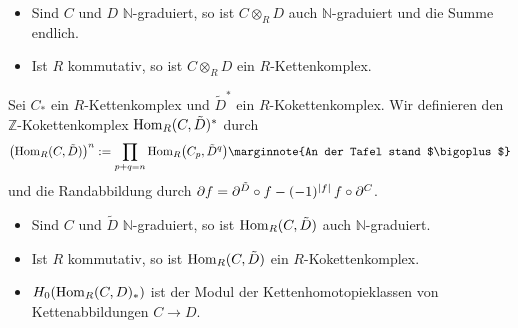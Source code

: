 \begin{bemerkung}[{name=[{zur Definition des Tensorprodukts von Kettenkomplexen}]}]
	\leavevmode
	\begin{itemize}[itemsep=0pt]
		\item Sind $C$ und $D$ $\mathbb{N}$-graduiert, so ist $C \otimes_R D$ auch $\mathbb{N}$-graduiert und die Summe endlich. 
		\item Ist $R$ kommutativ, so ist $C \otimes_R D$ ein $R$-Kettenkomplex.
	\end{itemize}
\end{bemerkung}

\begin{definition}[{name=[{Hom von Kettenkomplex und Kokettenkomplex}]}]
	Sei $C_*$ ein $R$-Kettenkomplex und $\tilde{D}^*$ ein $R$-Kokettenkomplex.
	Wir definieren den $\mathbb{Z}$-Kokettenkomplex $\Hom_R(C,\tilde{D})^*$ durch
	\[
		\enbrace*{\Hom_R(C,\tilde{D})}^n := \prod_{p+q=n} \Hom_R \enbrace*{C_p, \tilde{D}^q} \marginnote{An der Tafel stand $\bigoplus$} 
	\]
	und die Randabbildung durch
	\(
		\partial f = \partial^{\tilde{D}} \circ f - (-1)^{\abs*{f}}\, f \circ \partial^C
	\).
\end{definition}

\begin{bemerkung}[{name=[{zur Definition von Hom für Kettenkomplexe}]}]
	\leavevmode
	\begin{itemize}[itemsep=0pt]
		\item Sind $C$ und $\tilde{D}$ $\mathbb{N}$-graduiert, so ist  $\Hom_R(C,\tilde{D})$ auch $\mathbb{N}$-graduiert.
		\item Ist $R$ kommutativ, so ist $\Hom_R(C,\tilde{D})$ ein $R$-Kokettenkomplex.
		\item $H_0 \enbrace*{\Hom_R(C,D)_*}$ ist der Modul der Kettenhomotopieklassen von Kettenabbildungen $C \to D$.
	\end{itemize}
\end{bemerkung}

